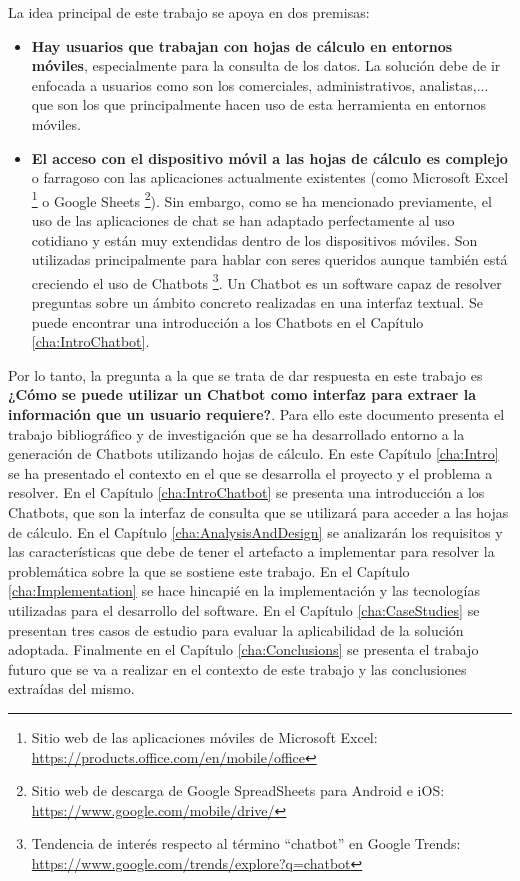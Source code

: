 La idea principal de este trabajo se apoya en dos premisas:
\begin{itemize}
	\item \textbf{Hay usuarios que trabajan con hojas de cálculo en entornos móviles}, especialmente para la consulta de los datos. La solución debe de ir enfocada a usuarios como son los comerciales, administrativos, analistas,... que son los que principalmente hacen uso de esta herramienta en entornos móviles.
	
	\item \textbf{El acceso con el dispositivo móvil a las hojas de cálculo es complejo} o farragoso con las aplicaciones actualmente existentes (como Microsoft Excel \footnote{Sitio web de las aplicaciones móviles de Microsoft Excel: \url{https://products.office.com/en/mobile/office}} o Google Sheets \footnote{Sitio web de descarga de Google SpreadSheets para Android e iOS: \url{https://www.google.com/mobile/drive/}}). Sin embargo, como se ha mencionado previamente, el uso de las aplicaciones de chat se han adaptado perfectamente al uso cotidiano y están muy extendidas dentro de los dispositivos móviles. Son utilizadas principalmente para hablar con seres queridos \cite{Montag2015} aunque también está creciendo el uso de Chatbots \footnote{Tendencia de interés respecto al término ``chatbot'' en Google Trends: \url{https://www.google.com/trends/explore?q=chatbot}}. Un Chatbot es un software capaz de resolver preguntas sobre un ámbito concreto realizadas en una interfaz textual. Se puede encontrar una introducción a los Chatbots en el Capítulo \ref{cha:IntroChatbot}.
\end{itemize}

Por lo tanto, la pregunta a la que se trata de dar respuesta en este trabajo es \textbf{¿Cómo se puede utilizar un Chatbot como interfaz para extraer la información que un usuario requiere?}. Para ello este documento presenta el trabajo bibliográfico y de investigación que se ha desarrollado entorno a la generación de Chatbots utilizando hojas de cálculo. En este Capítulo \ref{cha:Intro} se ha presentado el contexto en el que se desarrolla el proyecto y el problema a resolver. En el Capítulo \ref{cha:IntroChatbot} se presenta una introducción a los Chatbots, que son la interfaz de consulta que se utilizará para acceder a las hojas de cálculo. En el Capítulo \ref{cha:AnalysisAndDesign} se analizarán los requisitos y las características que debe de tener el artefacto a implementar para resolver la problemática sobre la que se sostiene este trabajo. En el Capítulo \ref{cha:Implementation} se hace hincapié en la implementación y las tecnologías utilizadas para el desarrollo del software. En el Capítulo \ref{cha:CaseStudies} se presentan tres casos de estudio para evaluar la aplicabilidad de la solución adoptada. Finalmente en el Capítulo \ref{cha:Conclusions} se presenta el trabajo futuro que se va a realizar en el contexto de este trabajo y las conclusiones extraídas del mismo.